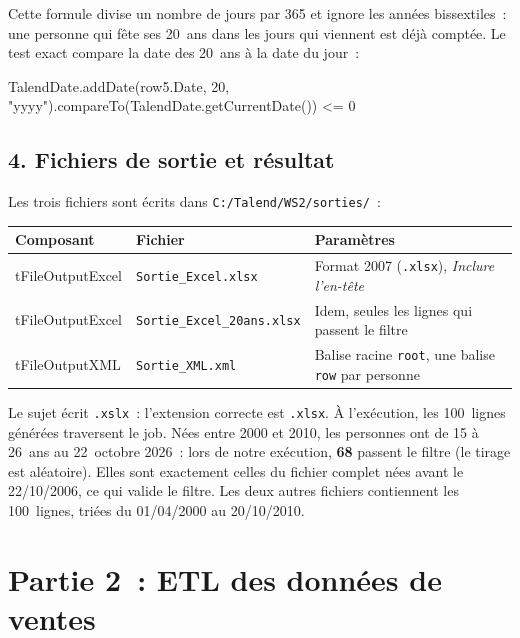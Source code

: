 \noindent Cette formule divise un nombre de jours par 365 et ignore les années bissextiles~: une personne qui fête ses 20~ans dans les jours qui viennent est déjà comptée. Le test exact compare la date des 20~ans à la date du jour~:

\begin{code}[title=\textbf{Filtre exact}~: la personne a eu 20 ans aujourd'hui ou avant]
TalendDate.addDate(row5.Date, 20, "yyyy").compareTo(TalendDate.getCurrentDate()) <= 0
\end{code}

\subsection*{4. Fichiers de sortie et résultat}
{}

\noindent Les trois fichiers sont écrits dans \texttt{C:/Talend/WS2/sorties/}~:

\begin{center}
\small
\begin{tabularx}{\textwidth}{>{\ttfamily}l l >{\raggedright\arraybackslash}X}
\toprule
\normalfont\textbf{Composant} & \textbf{Fichier} & \textbf{Paramètres} \\
\midrule
tFileOutputExcel & \texttt{Sortie\_Excel.xlsx} & Format 2007 (\texttt{.xlsx}), \textit{Inclure l'en-tête} \\
tFileOutputExcel & \texttt{Sortie\_Excel\_20ans.xlsx} & Idem, seules les lignes qui passent le filtre \\
tFileOutputXML & \texttt{Sortie\_XML.xml} & Balise racine \texttt{root}, une balise \texttt{row} par personne \\
\bottomrule
\end{tabularx}
\end{center}

\noindent Le sujet écrit \texttt{.xslx}~: l'extension correcte est \texttt{.xlsx}. \noindent À l'exécution, les 100~lignes générées traversent le job. Nées entre 2000 et 2010, les personnes ont de 15 à 26~ans au 22~octobre 2026~: lors de notre exécution, \textbf{68} passent le filtre (le tirage est aléatoire). Elles sont exactement celles du fichier complet nées avant le 22/10/2006, ce qui valide le filtre. Les deux autres fichiers contiennent les 100~lignes, triées du 01/04/2000 au 20/10/2010.

\newpage
\section*{Partie 2~: ETL des données de ventes}
{}

